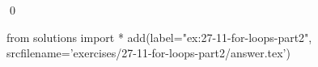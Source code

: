 
\begin{ex}
  \label{ex:27-11-for-loops-part2}
  
  \qed
\end{ex}
\begin{python0}
from solutions import *
add(label="ex:27-11-for-loops-part2",
    srcfilename='exercises/27-11-for-loops-part2/answer.tex')
\end{python0}
